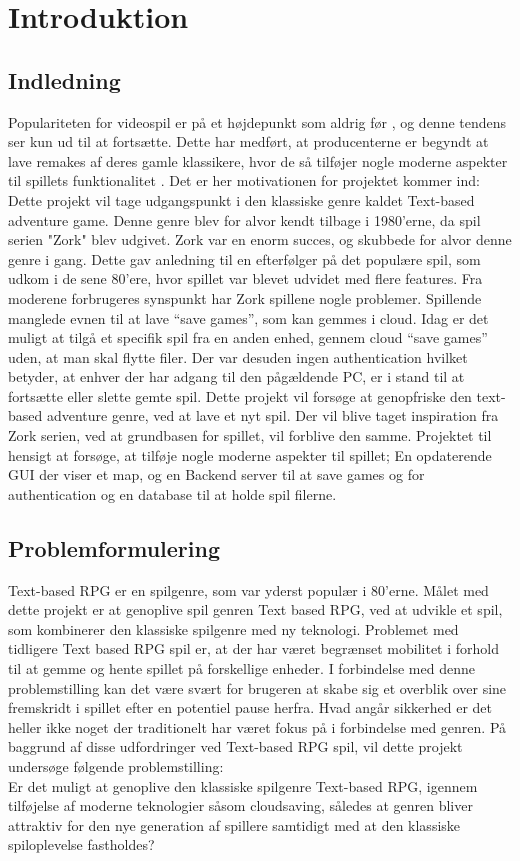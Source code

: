 \newpage
\section{Introduktion}
\subsection{Indledning}

Populariteten for videospil er på et højdepunkt som aldrig før \cite{WE-PC}, og denne tendens ser kun ud til at fortsætte. Dette har medført, at producenterne er begyndt at lave remakes af deres gamle klassikere, hvor de så tilføjer nogle moderne aspekter til spillets funktionalitet \cite{Protocol}. Det er her motivationen for projektet kommer ind: \\

Dette projekt vil tage udgangspunkt i den klassiske genre kaldet Text-based adventure game. Denne genre blev for alvor kendt tilbage i 1980'erne, da spil serien "Zork" blev udgivet. Zork var en enorm succes\cite{WikiZork}, og skubbede for alvor denne genre i gang. 
Dette gav anledning til en efterfølger på det populære spil, som udkom i de sene 80’ere, hvor spillet var blevet udvidet med flere features.
Fra moderene forbrugeres synspunkt har Zork spillene nogle problemer. Spillende manglede evnen til at lave ``save games'', som kan gemmes i cloud. 
Idag er det muligt at tilgå et specifik spil fra en anden enhed, gennem cloud ``save games'' uden, at man skal flytte filer. Der var desuden ingen 
authentication hvilket betyder, at enhver der har adgang til den pågældende PC, er i stand til at fortsætte eller slette gemte spil. 
Dette projekt vil forsøge at genopfriske den text-based adventure genre, ved at lave et nyt spil. Der vil blive taget inspiration 
fra Zork serien, ved at grundbasen for spillet, vil forblive den samme. Projektet til hensigt at forsøge, at tilføje nogle moderne aspekter til spillet;
En opdaterende GUI der viser et map, og en Backend server til at save games og for authentication og en database til at holde spil filerne.

\subsection{Problemformulering}
Text-based RPG er en spilgenre, som var yderst populær i 80’erne. Målet med dette projekt er at genoplive spil genren Text based RPG, ved at udvikle et spil, 
som kombinerer den klassiske spilgenre med ny teknologi. Problemet med tidligere Text based RPG spil er, at der har været begrænset mobilitet i forhold 
til at gemme og hente spillet på forskellige enheder. I forbindelse med denne problemstilling kan det være svært for brugeren at skabe sig et overblik over
sine fremskridt i spillet efter en potentiel pause herfra. Hvad angår sikkerhed er det heller ikke noget der traditionelt har været fokus på i forbindelse med genren. 
På baggrund af disse udfordringer ved Text-based RPG spil, vil dette projekt undersøge følgende problemstilling: \\

Er det muligt at genoplive den klassiske spilgenre Text-based RPG, igennem tilføjelse af moderne teknologier såsom cloudsaving, således at genren bliver attraktiv
for den nye generation af spillere samtidigt med at den klassiske spiloplevelse fastholdes?
